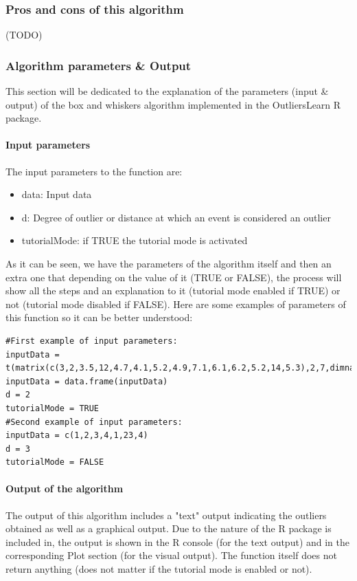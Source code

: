 \documentclass{article}
\begin{document}
\subsubsection{Pros and cons of this algorithm}
(TODO)
\subsubsection{Algorithm parameters \& Output}
This section will be dedicated to the explanation of the parameters (input \& output) of the box and whiskers algorithm implemented in the OutliersLearn R package.
\paragraph{Input parameters}
The input parameters to the function are:
\begin{itemize}
    \item data: Input data
    \item d: Degree of outlier or distance at which an event is considered an outlier
    \item tutorialMode: if TRUE the tutorial mode is activated
\end{itemize}
As it can be seen, we have the parameters of the algorithm itself and then an extra one that depending on the value of it (TRUE or FALSE), the process will show all the steps and an explanation to it (tutorial mode enabled if TRUE) or not (tutorial mode disabled if FALSE).
Here are some examples of parameters of this function so it can be better understood:
\begin{lstlisting}[style=RStyle, caption="Examples of parameters for the boxandwhiskers function]
#First example of input parameters:
inputData = t(matrix(c(3,2,3.5,12,4.7,4.1,5.2,4.9,7.1,6.1,6.2,5.2,14,5.3),2,7,dimnames=list(c("r","d"))))
inputData = data.frame(inputData)
d = 2
tutorialMode = TRUE
#Second example of input parameters:
inputData = c(1,2,3,4,1,23,4)
d = 3
tutorialMode = FALSE
\end{lstlisting}
\paragraph{Output of the algorithm}
The output of this algorithm includes a "text" output indicating the outliers obtained as well as a graphical output. Due to the nature of the R package is included in, the output is shown in the R console (for the text output) and in the corresponding Plot section (for the visual output). The function itself does not return anything (does not matter if the tutorial mode is enabled or not).
\end{document}
